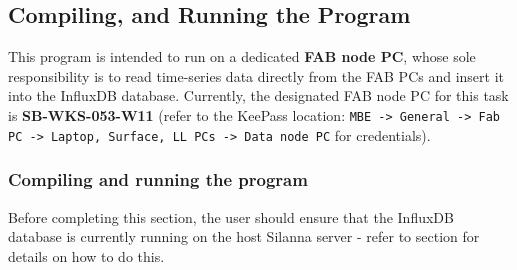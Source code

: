 \documentclass{article}
\begin{document}
\subsection{Compiling, and Running the Program}
\label{sec:Compiling_and_Running_the_program}
This program is intended to run on a dedicated \textbf{FAB node PC}, whose sole responsibility is to read time-series data directly from the FAB PCs and insert it into the InfluxDB database. Currently, the designated FAB node PC for this task is \textbf{SB-WKS-053-W11} (refer to the KeePass location: \texttt{MBE -> General -> Fab PC -> Laptop, Surface, LL PCs -> Data node PC} for credentials).

\subsubsection*{Compiling and running the program}
Before completing this section, the user should ensure that the InfluxDB database is currently running on the host Silanna server - refer to section \textbf{} for details on how to do this.
\end{document}
